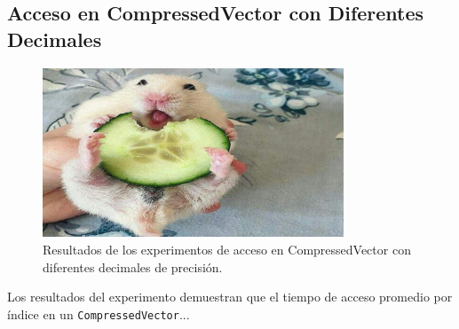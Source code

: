 \subsection{Acceso en CompressedVector con Diferentes Decimales}
\label{exp:cvd-access-decimals}

\begin{figure}[H]
    \centering
    \includegraphics[width=0.8\textwidth]{testing/images/decimal_places_access.png}
    \caption{Resultados de los experimentos de acceso en CompressedVector con diferentes decimales de precisión.}
    \label{fig:cvd-access-decimals}
\end{figure}

Los resultados del experimento demuestran que el tiempo de acceso promedio por índice en un \texttt{CompressedVector}...

